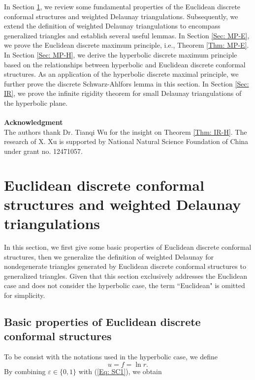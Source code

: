 \documentclass[12pt]{amsart}
\theoremstyle{definition}
\begin{document}
In Section \ref{Sec: DCS-WDT}, we review some fundamental properties of the Euclidean discrete conformal structures and weighted Delaunay triangulations.
Subsequently, we extend the definition of weighted Delaunay triangulations to encompass generalized triangles and establish several useful lemmas.
In Section \ref{Sec: MP-E}, we prove the Euclidean discrete maximum principle, i.e., Theorem \ref{Thm: MP-E}.
In Section \ref{Sec: MP-H}, we derive the hyperbolic discrete maximum principle based on the relationships between hyperbolic and Euclidean discrete conformal structures.
As an application of the hyperbolic discrete maximal principle, we further prove the discrete Schwarz-Ahlfors lemma in this section.
In Section \ref{Sec: IR}, we prove the infinite rigidity theorem for small Delaunay triangulations of the hyperbolic plane.
\\
\\
\textbf{Acknowledgment}\\[8pt]
The authors thank Dr. Tianqi Wu for the insight on Theorem \ref{Thm: IR-H}.
The research of X. Xu is supported by National Natural Science Foundation of China
under grant no. 12471057.



\section{Euclidean discrete conformal structures and weighted Delaunay triangulations}
\label{Sec: DCS-WDT}

In this section, we first give some basic properties of Euclidean discrete conformal structures, then we generalize the definition of weighted Delaunay for nondegenerate triangles generated by Euclidean discrete conformal structures to generalized triangles.
Given that this section exclusively addresses the Euclidean case and does not consider the hyperbolic case, the term ``Euclidean" is omitted for simplicity.

\subsection{Basic properties of Euclidean discrete conformal structures}

To be consist with the notations used in the hyperbolic case, we define 
\begin{equation*}
u=f = \ln r.
\end{equation*}
By combining $\varepsilon \in \{0,1\}$ with (\ref{Eq: SC1}), we obtain
\end{document}
